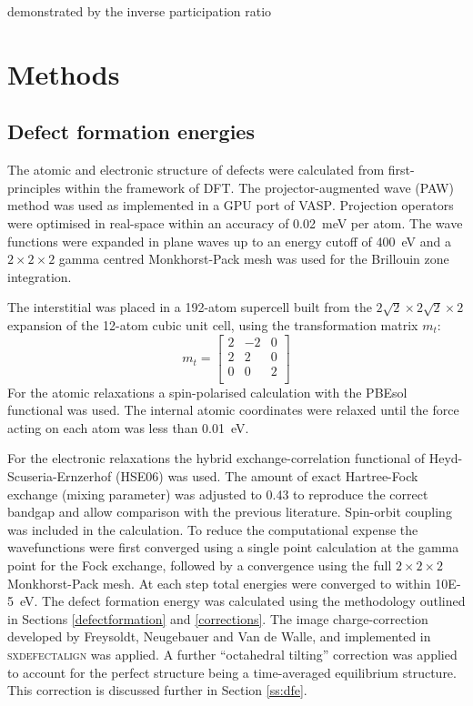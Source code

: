 
demonstrated by the inverse participation ratio 


\section{Methods}

\subsection{Defect formation energies} \label{method:dfe}

The atomic and electronic structure of defects were calculated from first-principles within the framework of DFT. The projector-augmented wave (PAW) method\autocite{Blochl1994} was used as implemented in a GPU port of \textsc{VASP}.\autocite{Kresse1996a} Projection operators were optimised in real-space within an accuracy of \SI{0.02}{\milli\electronvolt} per atom. The wave functions were expanded in plane waves up to an energy cutoff of \SI{400}{\electronvolt} and a $2\! \times\! 2\! \times\! 2$ gamma centred Monkhorst-Pack mesh was used for the Brillouin zone integration.

The interstitial was placed in a 192-atom supercell built from the $2\sqrt2\times2\sqrt2\times2$ expansion of the 12-atom cubic unit cell, using the transformation matrix $m_t$:
$$
m_t = \begin{bmatrix}
2 & -2 & 0 \\
2 & 2 & 0 \\
0 & 0 & 2 \\
\end{bmatrix}
$$
For the atomic relaxations a spin-polarised calculation with the PBEsol functional was used.\autocite{Perdew2008a} The internal atomic coordinates were relaxed until the force acting on each atom was less than \SI{0.01}{eV}. 

For the electronic relaxations the hybrid exchange-correlation functional of Heyd-Scuseria-Ernzerhof (HSE06) was used.\autocite{Heyd2004a,Heyd2005a} The amount of exact Hartree-Fock exchange (mixing parameter) was adjusted to 0.43 to reproduce the correct bandgap and allow comparison with the previous literature.\autocite{Meggiolaro2018,Du2015} 
Spin-orbit coupling was included in the calculation.
To reduce the computational expense the wavefunctions were first converged using a single point calculation at the gamma point for the Fock exchange, followed by a convergence using the full $2\! \times\! 2\! \times\! 2$ Monkhorst-Pack mesh. At each step total energies were converged to within \SI{10E-5}{\electronvolt}.
The defect formation energy was calculated using the methodology outlined in Sections \ref{defectformation} and \ref{corrections}. The image charge-correction developed by Freysoldt, Neugebauer and Van de Walle, and implemented in \textsc{sxdefectalign} was applied. A further ``octahedral tilting'' correction was applied to account for the perfect structure being a time-averaged equilibrium structure. This correction is discussed further in Section \ref{ss:dfe}.

